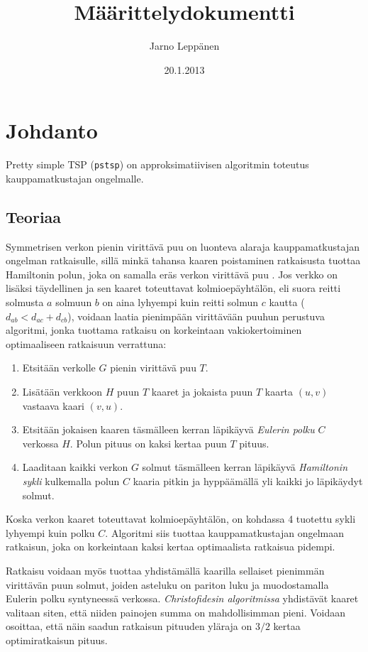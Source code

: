\documentclass[a4paper]{scrartcl}
\author{Jarno Leppänen}
\title{Määrittelydokumentti}
\date{20.1.2013}
\begin{document}
\maketitle

\section{Johdanto}
Pretty simple TSP (\texttt{pstsp}) on approksimatiivisen
algoritmin toteutus kauppamatkustajan ongelmalle.

\subsection{Teoriaa}
Symmetrisen verkon pienin virittävä puu on luonteva alaraja kauppamatkustajan
ongelman ratkaisulle, sillä minkä tahansa kaaren poistaminen ratkaisusta
tuottaa Hamiltonin polun, joka on samalla eräs verkon virittävä puu \cite{wi}.
Jos verkko on lisäksi täydellinen ja sen kaaret toteuttavat kolmioepäyhtälön,
eli suora reitti solmusta $a$ solmuun $b$ on aina lyhyempi
kuin reitti solmun $c$ kautta ($d_{ab} < d_{ac} + d_{cb}$), voidaan
laatia pienimpään virittävään puuhun perustuva algoritmi, jonka tuottama
ratkaisu on korkeintaan vakiokertoiminen optimaaliseen ratkaisuun verrattuna:
\begin{enumerate}
    \item Etsitään verkolle $G$ pienin virittävä puu $T$.
    \item Lisätään verkkoon $H$ puun $T$ kaaret ja jokaista puun $T$ kaarta
          $(u, v)$ vastaava kaari $(v, u)$.
    \item Etsitään jokaisen kaaren täsmälleen kerran läpikäyvä
          \emph{Eulerin polku} $C$
          verkossa $H$. Polun pituus on kaksi kertaa
          puun $T$ pituus.
    \item Laaditaan kaikki verkon $G$ solmut täsmälleen kerran läpikäyvä
          \emph{Hamiltonin sykli} kulkemalla polun $C$ kaaria pitkin ja
          hyppäämällä yli kaikki jo läpikäydyt solmut.
\end{enumerate}
Koska verkon kaaret toteuttavat kolmioepäyhtälön, on kohdassa 4 tuotettu sykli
lyhyempi kuin polku $C$. Algoritmi siis tuottaa kauppamatkustajan ongelmaan
ratkaisun, joka on korkeintaan kaksi kertaa optimaalista ratkaisua pidempi.

Ratkaisu voidaan myös tuottaa yhdistämällä kaarilla sellaiset 
pienimmän virittävän puun solmut, joiden asteluku on pariton luku ja
muodostamalla Eulerin polku syntyneessä verkossa.
\emph{Christofidesin algoritmissa}\cite{ch} yhdistävät kaaret valitaan
siten, että niiden painojen summa on mahdollisimman pieni. Voidaan
osoittaa, että näin saadun ratkaisun pituuden yläraja on $3/2$ kertaa 
optimiratkaisun pituus.
\end{document}
